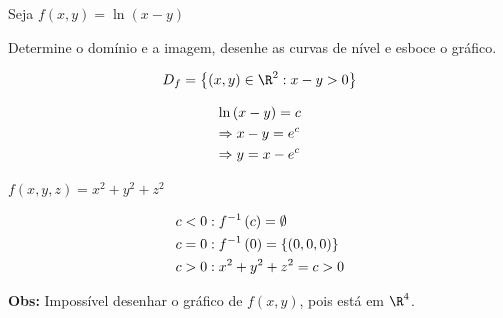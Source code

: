 \documentclass{book}
\begin{document}
\begin{ex}
Seja $f\left( {x,y} \right) = \ln \left( {x - y} \right)$

Determine o dom\'inio e a imagem, desenhe as curvas de n\'ivel e esboce o gr\'afico.
\end{ex}

\begin{sol}
\[
D_f  = \left\{ {\left( {x,y} \right) \in \R^2 :x - y > 0} \right\}
\]


\[
\begin{gathered}
\ln \left( {x - y} \right) = c \hfill \\
\Rightarrow x - y = e^c  \hfill \\
\Rightarrow y = x - e^c  \hfill \\
\end{gathered}
\]



\end{sol}

\newpage

\begin{ex}
$f\left( {x,y,z} \right) = x^2  + y^2  + z^2$
\end{ex}

\begin{sol}
\[
\begin{gathered}
c < 0:f^{ - 1} \left( c \right) = \emptyset  \hfill \\
  c = 0:f^{ - 1} \left( 0 \right) = \left\{ {\left( {0,0,0} \right)} \right\} \hfill \\
c > 0:x^2  + y^2  + z^2  = c > 0 \hfill \\
\end{gathered}
\]



\textbf{Obs:} Imposs\'ivel desenhar o gr\'afico de $f(x,y)$, pois est\'a em $\R^4$.
\end{sol}
\end{document}
